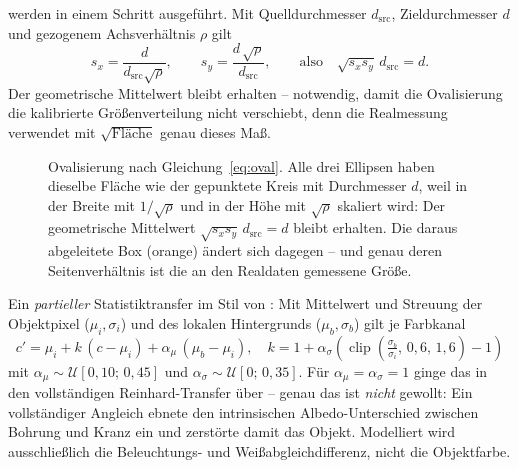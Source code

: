  werden in einem Schritt ausgeführt. Mit
Quelldurchmesser $d_{\text{src}}$, Zieldurchmesser $d$ und gezogenem
Achsverhältnis $\rho$ gilt
\begin{equation}
s_x = \frac{d}{d_{\text{src}}\sqrt{\rho}}, \qquad
s_y = \frac{d\,\sqrt{\rho}}{d_{\text{src}}},
\qquad\text{also}\quad \sqrt{s_x s_y}\, d_{\text{src}} = d .
\label{eq:oval}
\end{equation}
Der geometrische Mittelwert bleibt erhalten -- notwendig, damit die Ovalisierung
die kalibrierte Größenverteilung nicht verschiebt, denn die Realmessung verwendet
mit $\sqrt{\text{Fläche}}$ genau dieses Maß.

\begin{figure}[htbp]
\centering
{}
\caption[Ovalisierung]{Ovalisierung nach Gleichung~\eqref{eq:oval}. Alle drei
Ellipsen haben dieselbe Fläche wie der gepunktete Kreis mit Durchmesser $d$, weil
in der Breite mit $1/\sqrt{\rho}$ und in der Höhe mit $\sqrt{\rho}$
skaliert wird: Der geometrische Mittelwert $\sqrt{s_x s_y}\,d_{\text{src}} = d$
bleibt erhalten. Die daraus abgeleitete Box (orange) ändert sich dagegen -- und
genau deren Seitenverhältnis ist die an den Realdaten gemessene Größe.}
\label{abb:ovalisierung}
\end{figure}

 Ein \emph{partieller} Statistiktransfer im Stil von
\textcite{reinhard2001}: Mit Mittelwert und Streuung der Objektpixel
($\mu_i, \sigma_i$) und des lokalen Hintergrunds ($\mu_b, \sigma_b$) gilt je
Farbkanal
\begin{equation}
c' = \mu_i + k\,(c - \mu_i) + \alpha_\mu\,(\mu_b - \mu_i),
\quad
k = 1 + \alpha_\sigma\!\left(\operatorname{clip}\!\left(
\tfrac{\sigma_b}{\sigma_i},\, 0{,}6,\, 1{,}6\right) - 1\right)
\label{eq:harmonize}
\end{equation}
mit $\alpha_\mu \sim \mathcal{U}[0{,}10;\,0{,}45]$ und
$\alpha_\sigma \sim \mathcal{U}[0;\,0{,}35]$. Für
$\alpha_\mu = \alpha_\sigma = 1$ ginge das in den vollständigen
Reinhard-Transfer über -- genau das ist \emph{nicht} gewollt: Ein vollständiger
Angleich ebnete den intrinsischen Albedo-Unterschied zwischen Bohrung und Kranz
ein und zerstörte damit das Objekt. Modelliert wird ausschließlich die
Beleuchtungs- und Weißabgleichdifferenz, nicht die Objektfarbe.

